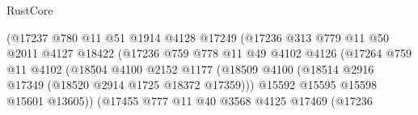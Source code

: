 \begin{lexlean}{RustCore}
\begin{coremodule}
                                        (@17237
                                          @780
                                          @11
                                          @51
                                          @1914
                                          @4128
                                          @17249
                                          (@17236
                                            @313
                                            @779
                                            @11
                                            @50
                                            @2011
                                            @4127
                                            @18422
                                            (@17236
                                              @759
                                              @778
                                              @11
                                              @49
                                              @4102
                                              @4126
                                              (@17264
                                                @759
                                                @11
                                                @4102
                                                (@18504
                                                  @4100
                                                  @2152
                                                  @1177
                                                  (@18509
                                                    @4100
                                                    (@18514
                                                      @2916
                                                      @17349
                                                      (@18520 @2914 @1725 @18372 @17359)))
                                                  @15592
                                                  @15595
                                                  @15598
                                                  @15601
                                                  @13605))
                                              (@17455
                                                @777
                                                @11
                                                @40
                                                @3568
                                                @4125
                                                @17469
                                                (@17236

\end{coremodule}
\end{lexlean}
